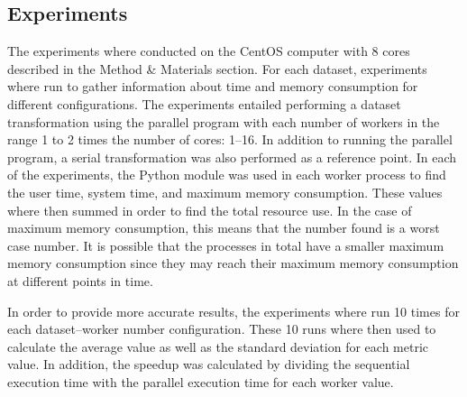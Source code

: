 \subsection{Experiments}
The experiments where conducted on the CentOS computer with 8 cores described in the Method \& Materials section.
For each dataset, experiments where run to gather information about time and memory consumption for different configurations.
The experiments entailed performing a dataset transformation using the parallel program with each number of workers in the range 1 to 2 times the number of cores: 1--16.
In addition to running the parallel program, a serial transformation was also performed as a reference point.
In each of the experiments, the Python  module was used in each worker process to find the user time, system time, and maximum memory consumption.
These values where then summed in order to find the total resource use. In the case of maximum memory consumption, this means that the number found is a worst case
number. It is possible that the processes in total have a smaller maximum memory consumption since they may reach their maximum memory consumption at different
points in time.

In order to provide more accurate results, the experiments where run 10 times for each dataset--worker number configuration. These 10 runs where then used to calculate the
average value as well as the standard deviation for each metric value. In addition, the speedup was calculated by dividing the sequential execution time with the parallel execution
time for each worker value.
